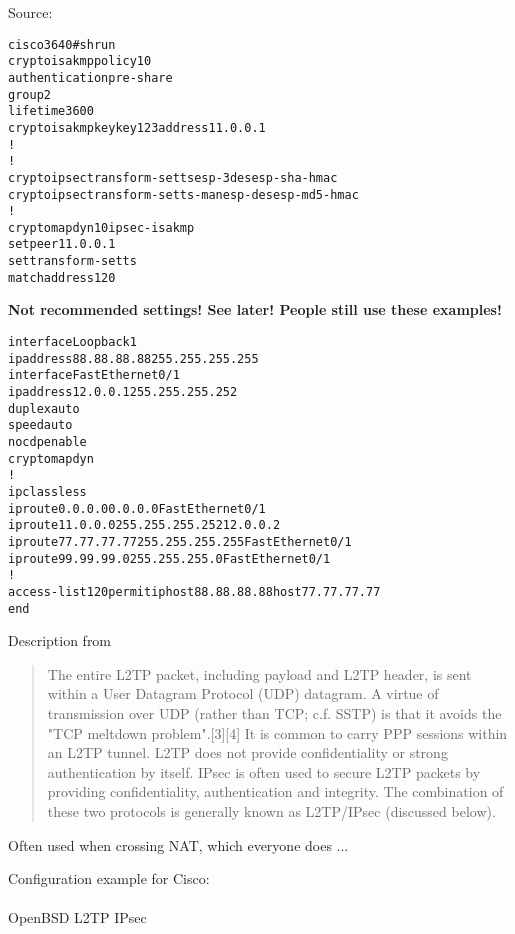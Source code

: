 \documentclass[Screen16to9,17pt]{foils}
\begin{document}
Source:


\begin{alltt}\small
cisco3640#sh run
crypto isakmp policy 10
 authentication pre-share
 group 2
 lifetime 3600
crypto isakmp key key123 address 11.0.0.1
!
!
crypto ipsec transform-set ts esp-3des esp-sha-hmac
crypto ipsec transform-set ts-man esp-des esp-md5-hmac
!
crypto map dyn 10 ipsec-isakmp
 set peer 11.0.0.1
 set transform-set ts
 match address 120
\end{alltt}

\centerline{\bf Not recommended settings! See later! People still use these examples!}


\begin{alltt}\small
interface Loopback1
 ip address 88.88.88.88 255.255.255.255
interface FastEthernet0/1
 ip address 12.0.0.1 255.255.255.252
 duplex auto
 speed auto
 no cdp enable
 crypto map dyn
!
ip classless
ip route 0.0.0.0 0.0.0.0 FastEthernet0/1
ip route 11.0.0.0 255.255.255.252 12.0.0.2
ip route 77.77.77.77 255.255.255.255 FastEthernet0/1
ip route 99.99.99.0 255.255.255.0 FastEthernet0/1
!
access-list 120 permit ip host 88.88.88.88 host 77.77.77.77
end
\end{alltt}


Description from
\begin{quote}\small
The entire L2TP packet, including payload and L2TP header, is sent within a User Datagram Protocol (UDP) datagram. A virtue of transmission over UDP (rather than TCP; c.f. SSTP) is that it avoids the "TCP meltdown problem".[3][4] It is common to carry PPP sessions within an L2TP tunnel. L2TP does not provide confidentiality or strong authentication by itself. IPsec is often used to secure L2TP packets by providing confidentiality, authentication and integrity. The combination of these two protocols is generally known as L2TP/IPsec (discussed below).
\end{quote}


Often used when crossing NAT, which everyone does ...

Configuration example for Cisco:\\
{\small {}}\\
OpenBSD L2TP IPsec\\
{\small{}}
\end{document}
